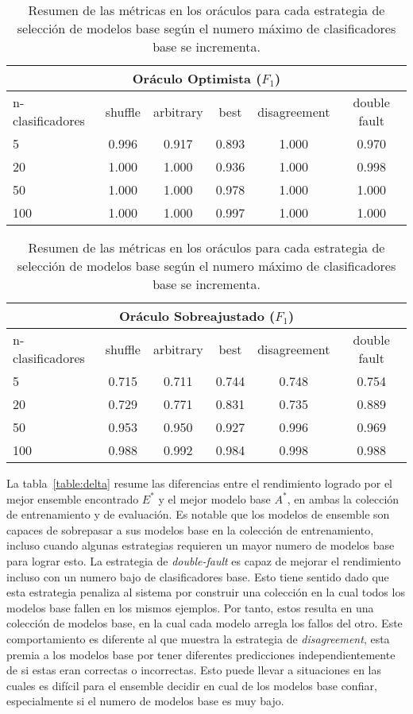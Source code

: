 \begin{table}[!htb]
    \centering

    \begin{tabular}{lccccc}
    \toprule
        \multicolumn{6}{c}{Oráculo Optimista ($F_1$)} \\ \midrule
        n-clasificadores & shuffle & arbitrary & best & disagreement & double fault  \\ \midrule \midrule
        5   & 0.996 & 0.917 & 0.893 & 1.000 & 0.970 \\
        20  & 1.000 & 1.000 & 0.936 & 1.000 & 0.998 \\
        50  & 1.000 & 1.000 & 0.978 & 1.000 & 1.000 \\
        100 & 1.000 & 1.000 & 0.997 & 1.000 & 1.000 \\
    \bottomrule
    \end{tabular}

    \begin{tabular}{lccccc}
    \toprule
        \multicolumn{6}{c}{Oráculo Sobreajustado ($F_1$)} \\ \midrule
        n-clasificadores & shuffle & arbitrary & best & disagreement & double fault  \\ \midrule \midrule
        5   & 0.715 & 0.711 & 0.744 & 0.748 & 0.754 \\
        20  & 0.729 & 0.771 & 0.831 & 0.735 & 0.889 \\
        50  & 0.953 & 0.950 & 0.927 & 0.996 & 0.969 \\
        100 & 0.988 & 0.992 & 0.984 & 0.998 & 0.988 \\
    \bottomrule
    \end{tabular}

    \caption{Resumen de las métricas en los oráculos para cada estrategia de selección de modelos base según el numero máximo de clasificadores base se incrementa.}
    \label{table:oracle}
\end{table}

La tabla~\ref{table:delta} resume las diferencias entre el rendimiento logrado por el mejor ensemble encontrado $E^*$ y el mejor modelo base $A^*$, en ambas la colección de entrenamiento y de evaluación.
Es notable que los modelos de ensemble son capaces de sobrepasar a sus modelos base en la colección de entrenamiento, incluso cuando algunas estrategias requieren un mayor numero de modelos base para lograr esto.
La estrategia de \emph{double-fault} es capaz de mejorar el rendimiento incluso con un numero bajo de clasificadores base.
Esto tiene sentido dado que esta estrategia penaliza al sistema por construir una colección en la cual todos los modelos base fallen en los mismos ejemplos.
Por tanto, estos resulta en una colección de modelos base, en la cual cada modelo arregla los fallos del otro.
Este comportamiento es diferente al que muestra la estrategia de \emph{disagreement}, esta premia a los modelos base por tener diferentes predicciones independientemente de si estas eran correctas o incorrectas.
Esto puede llevar a situaciones en las cuales es difícil para el ensemble decidir en cual de los modelos base confiar, especialmente si el numero de modelos base es muy bajo.

